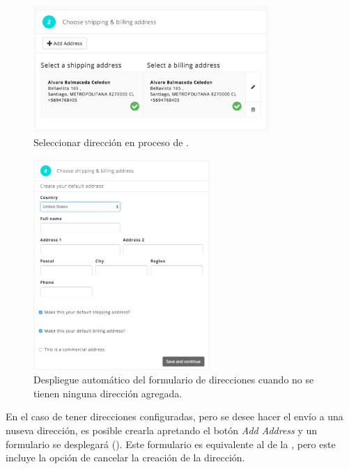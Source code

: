 	\begin{figure}[H]
		\centering
		\includegraphics[width=0.8\textwidth]{figuras/shipping/step_address.png}
		\caption{Seleccionar dirección en proceso de \shippingEF.}
		\label{figure:checkout:step_address}
	\end{figure}

	\begin{figure}[H]
		\centering
		\includegraphics[width=0.6\textwidth]{figuras/shipping/form_address.png}
		\caption{Despliegue automático del formulario de direcciones cuando no se tienen ninguna dirección agregada.}
		\label{figure:checkout:form_address}
	\end{figure}


	En el caso de tener direcciones configuradas, pero se desee hacer el envío a una nuseva dirección, es posible crearla apretando el botón \textit{Add Address} y un formulario se desplegará (). Este formulario es equivalente al de la , pero este incluye la opción de cancelar la creación de la dirección.

